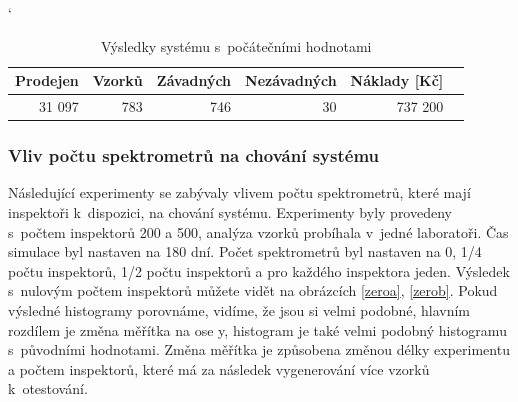 \documentclass[11pt,a4paper]{article}
\begin{document}
  \begin{table}[h!]
    \catcode`
    \begin{center}
      \begin{tabular}{|r|r|r|r|r|r|}  \hline
        \textbf{Prodejen} & \textbf{Vzorků} & \textbf{Závadných}   
        & \textbf{Nezávadných} & \textbf{Náklady [Kč]} \\\hline
        31 097&783&746&30&737 200         \\\hline
      \end{tabular}
      \caption{Výsledky systému s~počátečními hodnotami}
      \label{tabinit}
    \end{center}
  \end{table} 
\vfill
\subsubsection*{Vliv počtu spektrometrů na chování systému}
Následující experimenty se zabývaly vlivem počtu spektrometrů,
které mají inspektoři k~dispozici, na chování systému. Experimenty byly
provedeny s~počtem inspektorů 200 a 500, analýza vzorků probíhala v~jedné 
laboratoři. Čas simulace byl nastaven na 180 dní. Počet spektrometrů byl
nastaven na 0, 1/4 počtu inspektorů, 1/2 počtu inspektorů a pro každého
inspektora jeden. Výsledek s~nulovým počtem inspektorů můžete vidět na obrázcích
\ref{zeroa}, \ref{zerob}. Pokud výsledné histogramy porovnáme, vidíme, že jsou
si velmi podobné, hlavním rozdílem je změna měřítka na ose y, histogram je také
velmi podobný histogramu s~původními hodnotami. Změna měřítka je způsobena
změnou délky experimentu a počtem inspektorů, které má za následek vygenerování
více vzorků k~otestování.
\end{document}
